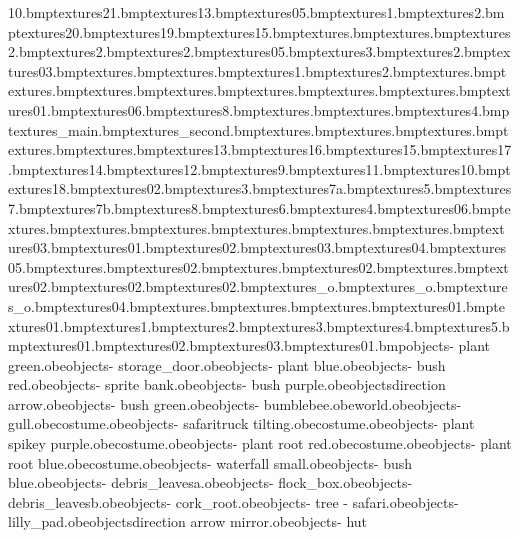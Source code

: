 10.bmp textures\wpaper21.bmp textures\wpaper13.bmp textures\wpaper05.bmp textures\wpaperfish1.bmp textures\wpaperfish2.bmp textures\wpaper20.bmp textures\wpaper19.bmp textures\wpaper15.bmp textures\housefloor.bmp textures\safsignhoney.bmp textures\safsignmonk2.bmp textures\safsignhoney2.bmp textures\safsignbana2.bmp textures\sign05.bmp textures\safsigntree3.bmp textures\safsigntree2.bmp textures\sign03.bmp textures\antanae.bmp textures\cagepipe.bmp textures\samdoorexit1.bmp textures\samdoorexit2.bmp textures\safariwater.bmp textures\samgateedge.bmp textures\fgre.bmp textures\fpurp.bmp textures\fblu.bmp textures\fred.bmp textures\test.bmp textures\blucage01.bmp textures\bluhut06.bmp textures\browtree8.bmp textures\plantspikeblue.bmp textures\plantspikegreen.bmp textures\wbridge4.bmp textures\safarinew_main.bmp textures\safarinew_second.bmp textures\window.bmp textures\lillipad.bmp textures\plantspikepurple.bmp textures\plantspikered.bmp textures\safaridangerdoor.bmp textures\safarifruitree13.bmp textures\safarifruitree16.bmp textures\safarifruitree15.bmp textures\safarifruitree17.bmp textures\safarifruitree14.bmp textures\safarifruitree12.bmp textures\safarifruitree9.bmp textures\safarifruitree11.bmp textures\safarifruitree10.bmp textures\safarifruitree18.bmp textures\waterfall02.bmp textures\safarifruitree3.bmp textures\safarifruitree7a.bmp textures\safarifruitree5.bmp textures\safarifruitree7.bmp textures\safarifruitree7b.bmp textures\safarifruitree8.bmp textures\safarifruitree6.bmp textures\safarifruitree4.bmp textures\sign06.bmp textures\beesting.bmp textures\beestripes.bmp textures\beeeyes.bmp textures\beeteeth.bmp textures\beelegs.bmp textures\beewings.bmp textures\tazstopwood03.bmp textures\whackbit01.bmp textures\whackbit02.bmp textures\whackbit03.bmp textures\whackbit04.bmp textures\whackbit05.bmp textures\rockbrown.bmp textures\rockbrown02.bmp textures\rockgrey.bmp textures\rockgrey02.bmp textures\rocksafari.bmp textures\rocksafari02.bmp textures\crisps02.bmp textures\fizzydrink02.bmp textures_o.bmp textures_o.bmp textures_o.bmp textures\fruit04.bmp textures\banana.bmp textures\apple.bmp textures\cheese.bmp textures\crisps01.bmp textures\fizzydrink01.bmp textures\bombbit1.bmp textures\bombbit2.bmp textures\bombbit3.bmp textures\bombbit4.bmp textures\bombbit5.bmp textures\feather01.bmp textures\feather02.bmp textures\feather03.bmp textures\splinter01.bmp objects\bank - plant green.obe objects\bank - storage_door.obe objects\bank - plant blue.obe objects\bank - bush red.obe objects\bank - sprite bank.obe objects\bank - bush purple.obe objects\multi direction arrow.obe objects\bank - bush green.obe objects\bank - bumblebee.obe world.obe objects\bank - gull.obe costume\tazskater.obe objects\bank - safaritruck tilting.obe costume\skaterelbowpadl.obe objects\bank - plant spikey purple.obe costume\skaterelbowpadr.obe objects\bank - plant root red.obe costume\skaterskateboard.obe objects\bank - plant root blue.obe costume\skaterbaseballcap.obe objects\bank - waterfall small.obe objects\bank - bush blue.obe objects\bank - debris_leavesa.obe objects\bank - flock_box.obe objects\bank - debris_leavesb.obe objects\bank - cork_root.obe objects\bank - tree - safari.obe objects\bank - lilly_pad.obe objects\multi direction arrow mirror.obe objects\bank - hut 